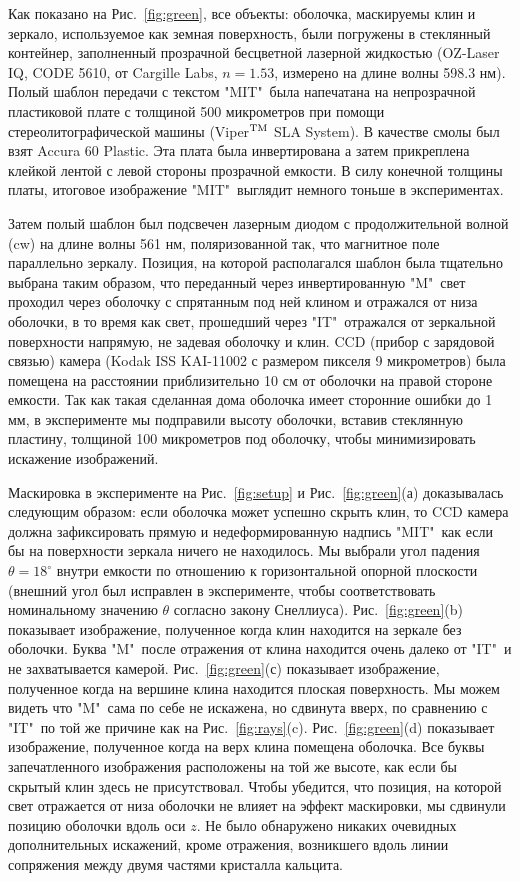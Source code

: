 \documentclass[a4paper, 12pt]{article}
\begin{document}
Как показано на Рис.~\ref{fig:green}, все объекты: оболочка, маскируемы клин
и зеркало, используемое как земная поверхность, были погружены в 
стеклянный контейнер, заполненный прозрачной бесцветной лазерной жидкостью
(OZ-Laser IQ, CODE 5610, от Cargille Labs, $n=1.53$,  измерено на длине волны
598.3 нм). Полый шаблон передачи с текстом "MIT"\ была напечатана на
непрозрачной пластиковой плате с толщиной 500 микрометров при помощи
стереолитографической машины (Viper$^{\rm TM}$ SLA System). В качестве
смолы был взят Accura 60 Plastic. Эта плата была инвертирована а затем
прикреплена клейкой лентой с левой стороны прозрачной емкости. В силу
конечной толщины платы, итоговое изображение "MIT"\ выглядит немного тоньше
в экспериментах.

Затем полый шаблон был подсвечен лазерным диодом с продолжительной волной (cw) 
на длине волны 561 нм, поляризованной так, что магнитное поле параллельно 
зеркалу. Позиция, на которой располагался шаблон была тщательно выбрана таким образом, что переданный через инвертированную "M"\ свет проходил через
оболочку с спрятанным под ней клином и отражался от низа оболочки, в то время
как свет, прошедший через "IT"\, отражался от зеркальной поверхности напрямую,
не задевая оболочку и клин. CCD (прибор с зарядовой связью) камера 
(Kodak ISS KAI-11002 с размером пикселя 9 микрометров) была помещена на 
расстоянии приблизительно 10 см от оболочки на правой стороне емкости.
Так как такая сделанная дома оболочка имеет сторонние ошибки до 1 мм,
в эксперименте мы подправили высоту оболочки, вставив стеклянную пластину, 
толщиной 100 микрометров под оболочку, чтобы минимизировать искажение 
изображений.

Маскировка в эксперименте на Рис.~\ref{fig:setup} и Рис.~\ref{fig:green}(а) 
доказывалась следующим образом: если оболочка может успешно скрыть клин, то
CCD камера должна зафиксировать прямую и недеформированную надпись "MIT"\,
как если бы на поверхности зеркала ничего не находилось. Мы выбрали угол
падения $\theta = 18^\circ$ внутри емкости по отношению к горизонтальной
опорной плоскости (внешний угол был исправлен в эксперименте, чтобы 
соответствовать номинальному значению $\theta$ согласно закону Снеллиуса).
Рис.~\ref{fig:green}(b) показывает изображение, полученное когда клин находится
на зеркале без оболочки. Буква "M"\, после отражения от клина находится очень
далеко от "IT"\ и не захватывается камерой. Рис.~\ref{fig:green}(с) показывает
изображение, полученное когда на вершине клина находится плоская поверхность.
Мы можем видеть что "M"\ сама по себе не искажена, но сдвинута вверх, по
сравнению с "IT"\, по той же причине как на Рис.~\ref{fig:rays}(c).
Рис.~\ref{fig:green}(d) показывает изображение, полученное когда на верх
клина помещена оболочка. Все буквы запечатленного изображения расположены
на той же высоте, как если бы скрытый клин здесь не присутствовал. Чтобы 
убедится, что позиция, на которой свет отражается от низа оболочки не влияет
на эффект маскировки, мы сдвинули позицию оболочки вдоль оси $z$. Не было
обнаружено никаких очевидных дополнительных искажений, кроме отражения,
возникшего вдоль линии сопряжения между двумя частями кристалла кальцита.
\end{document}

